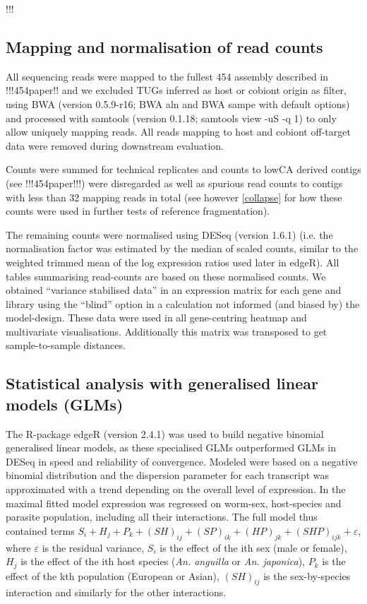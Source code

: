 \documentclass[10pt]{article}
\begin{document}
!!!

\subsection{Mapping and normalisation of read counts}

All sequencing reads were mapped to the fullest 454 assembly described
in !!!454paper!! and we excluded TUGs inferred as host or cobiont
origin as filter, using BWA \cite{pmid20080505} (version 0.5.9-r16;
BWA aln and BWA sampe with default options) and processed with
samtools \cite{journals/bioinformatics/LiHWFRHMAD09} (version 0.1.18;
samtools view -uS -q 1) to only allow uniquely mapping reads. All
reads mapping to host and cobiont off-target data were removed during
downstream evaluation.

Counts were summed for technical replicates and counts to lowCA
derived contigs (see !!!454paper!!!) were disregarded as well as
spurious read counts to contigs with less than 32 mapping reads in
total (see however \ref{collapse} for how these counts were used in
further tests of reference fragmentation).

The remaining counts were normalised using DESeq (version 1.6.1) (i.e.
the normalisation factor was estimated by the median of scaled counts,
similar to the weighted trimmed mean of the log expression ratios used
later in edgeR). All tables summarising read-counts are based on these
normalised counts. We obtained ``variance stabilised data'' in an
expression matrix for each gene and library using the ``blind'' option
in a calculation not informed (and biased by) the model-design. These
data were used in all gene-centring heatmap and multivariate
visualisations. Additionally this matrix was transposed to get
sample-to-sample distances.

\subsection{Statistical analysis with generalised linear models (GLMs)}

The R-package edgeR (version 2.4.1) \cite{pmid19910308} was used to
build negative binomial generalised linear models, as these
specialised GLMs outperformed GLMs in DESeq in speed and reliability
of convergence. Modeled were based on a negative binomial distribution
and the dispersion parameter for each transcript was approximated with
a trend depending on the overall level of expression. In the maximal
fitted model expression was regressed on worm-sex, host-species and
parasite population, including all their interactions. The full model
thus contained terms $ S_i + H_j + P_k + (SH)_{ij} + (SP)_{ik} +
(HP)_{jk} + (SHP)_{ijk} + \varepsilon$, where $\varepsilon$ is the
residual variance, $S_i$ is the effect of the ith sex (male or
female), $H_j$ is the effect of the ith host species
(\textit{An. anguilla} or \textit{An. japonica}), $P_k$ is the effect
of the kth population (European or Asian), $(SH)_{ij}$ is the
sex-by-species interaction and similarly for the other interactions.
\end{document}
